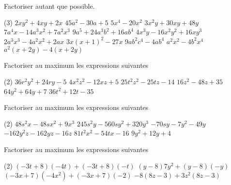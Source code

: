 \documentclass[a4paper,12pt]{report}
\begin{document}
\begin{exo}
Factoriser autant que possible.
	\begin{tasks}(3)
\task $2 x y^2+4 x y+2 x$
\task $45 a^2-30 a+5$
\task $5 x^4-20 x^2$
\task $3 x^2 y+30 x y+48 y$
\task $7 a^4 x-14 a^3 x^2+7 a^2 x^3$
\task $9 a^5+24 a^3 b^2+16 a b^4$
\task $4 x^3 y-16 x^2 y^2+16 x y^3$
\task $2 a^3 x^3-4 a^2 x^2+2 a x$
\task $3 x(x+1)^2-27 x$
\task $9 a b^2 c^4-4 a b^4$
\task $a^2 x^2-4 b^2 x^4$
\task $a^2(x+2 y)-4(x+2 y)$
	\end{tasks}
\end{exo}



\begin{auto}Factoriser au maximum les expressions suivantes

\begin{tasks}(2)
	\task $36 r^2 y^2 + 24 r y-5 $
	\task $4 x^2 z^2-12 x z + 5 $
	\task $25 t^2 z^2-25 t z-14 $
	\task $16 z^2-48 z + 35 $
	\task $64 y^2 + 64 y + 7 $
	\task $36 t^2 + 12 t-35 $
\end{tasks}
\end{auto}

\begin{auto}Factoriser au maximum les expressions suivantes

\begin{tasks}(2)
	\task $48 s^2 x-48 s x^2 + 9 x^3$
	\task $245 s^2 y-560 s y^2 + 320 y^3$
	\task $-70 s y-7 y^2-49 y$
	\task $-162 y^2 z-162 y z-16 z$
	\task $81 t^2 x^2-54 t x-16 $
	\task $9 y^2 + 12 y + 4 $
\end{tasks}
\end{auto}

\begin{auto}Factoriser au maximum les expressions suivantes

\begin{tasks}(2)
	\task $(-3 t + 8 )\left(-4 t\right)+(-3 t + 8 )\left(-t\right)$
	\task $(y-8 )7 y^2+(y-8 )\left(-y\right)$
	\task $(-3 x + 7 )\left(-4 x^2\right)+(-3 x + 7 )\left(-2 \right)$
	\task $-8 (8 z-3 )+3 z^2(8 z-3 )$
\end{tasks}
\end{auto}
\end{document}
